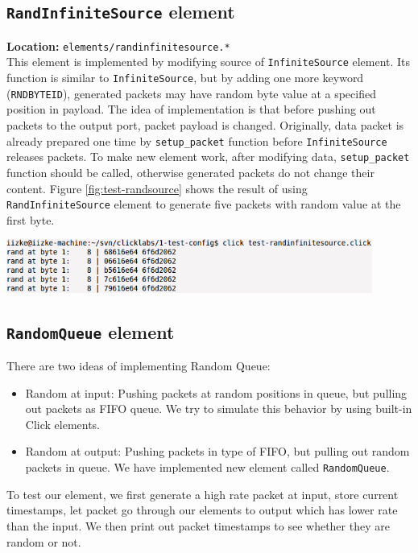 \documentclass[a4paper]{article}
\begin{document}
  \subsection{\texttt{RandInfiniteSource} element}
  \textbf{Location:} \texttt{elements/randinfinitesource.*} \\
  This element is implemented by modifying source of \texttt{InfiniteSource} element. Its function is similar to \texttt{InfiniteSource}, but by adding one more keyword (\texttt{RNDBYTEID}), generated packets may have random byte value at a specified position in payload. The idea of implementation is that before pushing out packets to the output port, packet payload is changed. Originally, data packet is already prepared one time by \texttt{setup\_packet} function before \texttt{InfiniteSource} releases packets. To make new element work, after modifying data, \texttt{setup\_packet} function should be called, otherwise generated packets do not change their content. Figure \ref{fig:test-randsource} shows the result of using \texttt{RandInfiniteSource} element to generate five packets with random value at the first byte.
  \begin{center}
	\includegraphics[width=0.9\textwidth]{test-randinfinitesource.png}
	\label{fig:test-randsource}
  \end{center}

  \subsection{\texttt{RandomQueue} element}
  There are two ideas of implementing Random Queue:
  \begin{itemize}
  	\item Random at input: Pushing packets at random positions in queue, but pulling out packets as FIFO queue. We try to simulate this behavior by using built-in Click elements.
  	\item Random at output: Pushing packets in type of FIFO, but pulling out random packets in queue. We have implemented new element called \texttt{RandomQueue}.
  \end{itemize}
  To test our element, we first generate a high rate packet at input, store current timestamps, let packet go through our elements to output which has lower rate than the input. We then print out packet timestamps to see whether they are random or not.
\end{document}
